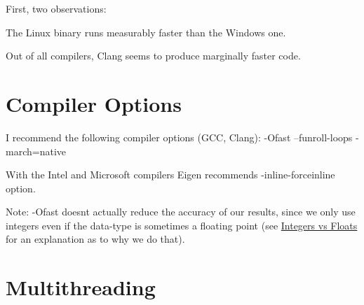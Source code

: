 First, two observations\+:


\begin{DoxyItemize}
\item The Linux binary runs measurably faster than the Windows one.
\item Out of all compilers, Clang seems to produce marginally faster code.
\end{DoxyItemize}\hypertarget{perf_compoptions}{}\section{Compiler Options}\label{perf_compoptions}

\begin{DoxyItemize}
\item I recommend the following compiler options (G\+CC, Clang)\+: {\ttfamily -\/\+Ofast --funroll-\/loops -\/march=native }
\item With the Intel and Microsoft compilers Eigen recommends {\ttfamily -\/inline-\/forceinline} option.
\item Note\+: {\ttfamily -\/\+Ofast} doesn\textquotesingle{}t actually reduce the accuracy of our results, since we only use integers even if the data-\/type is sometimes a floating point (see \hyperlink{perf_intvsfloat}{Integers vs Floats} for an explanation as to why we do that). 
\end{DoxyItemize}\hypertarget{perf_thread}{}\section{Multithreading}\label{perf_thread}

